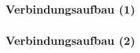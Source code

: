 \begin{frame}[fragile]
	\frametitle{Verbindungsaufbau (1)}

	
\end{frame}

\begin{frame}[fragile]
	\frametitle{Verbindungsaufbau (2)}

	
\end{frame}





